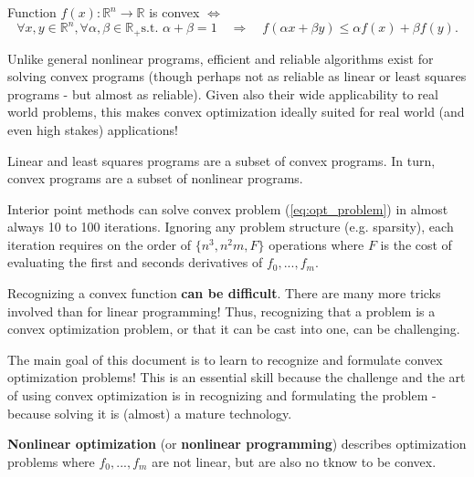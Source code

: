 \begin{Definition}
  Function $f(x):\mathbb R^n\to\mathbb R$ is convex $\Leftrightarrow$
  \begin{equation*}
    \forall x,y\in\mathbb R^n, \forall \alpha,\beta\in\mathbb R_+\text{
      s.t. }\alpha+\beta=1\quad\Rightarrow\quad f(\alpha x+\beta y)\le \alpha f(x)+\beta f(y).
  \end{equation*}
\end{Definition}

Unlike general nonlinear programs, efficient and reliable algorithms exist for
solving convex programs (though perhaps not as reliable as linear or least
squares programs - but almost as reliable). Given also their wide applicability
to real world problems, this makes convex optimization ideally suited for real
world (and even high stakes) applications!

\begin{Fact}
  Linear and least squares programs are a subset of convex programs. In turn,
  convex programs are a subset of nonlinear programs.
\end{Fact}

\begin{Fact}
  Interior point methods can solve convex problem (\ref{eq:opt_problem}) in
  almost always 10 to 100 iterations. Ignoring any problem structure
  (e.g. sparsity), each iteration requires on the order of $\{n^3, n^2m, F\}$
  operations where $F$ is the cost of evaluating the first and seconds
  derivatives of $f_0,...,f_m$.
\end{Fact}

Recognizing a convex function \textbf{can be difficult}. There are many more
tricks involved than for linear programming! Thus, recognizing that a problem is
a convex optimization problem, or that it can be cast into one, can be
challenging.

\begin{Fact}
  The main goal of this document is to learn to recognize and formulate convex
  optimization problems! This is an essential skill because the challenge and
  the art of using convex optimization is in recognizing and formulating the
  problem - because solving it is (almost) a mature technology.
\end{Fact}


\begin{Definition}
  \textbf{Nonlinear optimization} (or \textbf{nonlinear programming}) describes
  optimization problems where $f_0,...,f_m$ are not linear, but are also no
  tknow to be convex.
\end{Definition}


